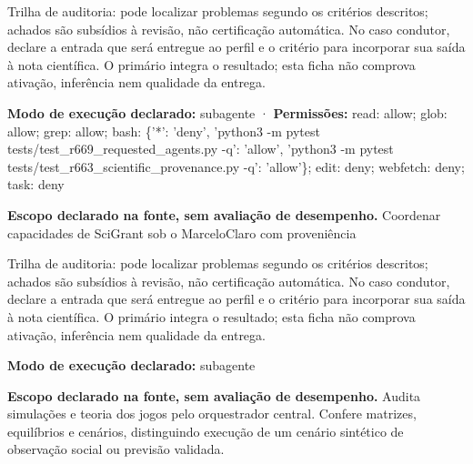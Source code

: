 \begin{funcao}
Trilha de auditoria: pode localizar problemas segundo os critérios descritos; achados são subsídios à revisão, não certificação automática. No caso condutor, declare a entrada que será entregue ao perfil e o critério para incorporar sua saída à nota científica. O primário integra o resultado; esta ficha não comprova ativação, inferência nem qualidade da entrega.
\end{funcao}

\begin{arquitetura}
\textbf{Modo de execução declarado:} subagente · \textbf{Permissões:} read: allow; glob: allow; grep: allow; bash: \{'*': 'deny', 'python3 -m pytest tests/test\_r669\_requested\_agents.py -q': 'allow', 'python3 -m pytest tests/test\_r663\_scientific\_provenance.py -q': 'allow'\}; edit: deny; webfetch: deny; task: deny
\end{arquitetura}


\begin{descricao}
\textbf{Escopo declarado na fonte, sem avaliação de desempenho.}
Coordenar capacidades de SciGrant sob o MarceloClaro com proveniência
\end{descricao}

\begin{funcao}
Trilha de auditoria: pode localizar problemas segundo os critérios descritos; achados são subsídios à revisão, não certificação automática. No caso condutor, declare a entrada que será entregue ao perfil e o critério para incorporar sua saída à nota científica. O primário integra o resultado; esta ficha não comprova ativação, inferência nem qualidade da entrega.
\end{funcao}

\begin{arquitetura}
\textbf{Modo de execução declarado:} subagente
\end{arquitetura}


\begin{descricao}
\textbf{Escopo declarado na fonte, sem avaliação de desempenho.}
Audita simulações e teoria dos jogos pelo orquestrador central. Confere matrizes, equilíbrios e cenários, distinguindo execução de um cenário sintético de observação social ou previsão validada.
\end{descricao}

